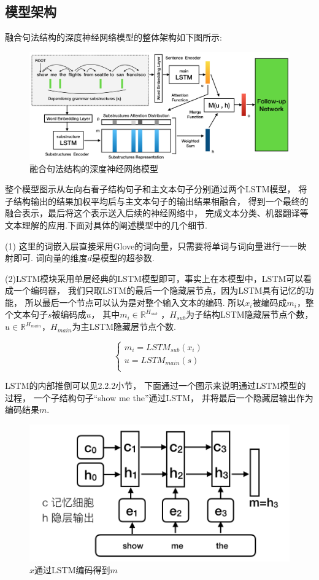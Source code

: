 \documentclass[bachelor,adobefonts]{jnuthesis}
\begin{document}
\subsection{模型架构}
融合句法结构的深度神经网络模型的整体架构如下图所示:
\begin{figure}[h!]
  \centering
  \includegraphics[width=0.95\linewidth]{model.png}
  \caption{融合句法结构的深度神经网络模型}
\end{figure}

整个模型图示从左向右看子结构句子和主文本句子分别通过两个LSTM模型，
将子结构输出的结果加权平均后与主文本句子的输出结果相融合，
得到一个最终的融合表示，最后将这个表示送入后续的神经网络中，
完成文本分类、机器翻译等文本理解的应用.下面对具体的阐述模型中的几个细节.

(1) 这里的词嵌入层直接采用Glove的词向量，只需要将单词与词向量进行一一映射即可.
词向量的维度$d$是模型的超参数.

(2)LSTM模块采用单层经典的LSTM模型即可，事实上在本模型中，LSTM可以看成一个编码器，
我们只取LSTM的最后一个隐藏层节点，因为LSTM具有记忆的功能，
所以最后一个节点可以认为是对整个输入文本的编码.
所以$x_{i}$被编码成$m_{i}$，整个文本句子$s$被编码成$u$，
其中$m_{i} \in \mathbb{R}^{H_{sub}}$ ，$H_{sub}$为子结构LSTM隐藏层节点个数，
$u \in \mathbb{R}^{H_{main}}$，$H_{main}$为主LSTM隐藏层节点个数.

\begin{equation}
\left\{
  \begin{array}{l}
   m_{i} = LSTM_{sub}(x_{i}) \\ 
   u = LSTM_{main}(s) \\ 
  \end{array}
  \right.
\end{equation}

LSTM的内部推倒可以见2.2.2小节，
下面通过一个图示来说明通过LSTM模型的过程，
一个子结构句子“show me the”通过LSTM，
并将最后一个隐藏层输出作为编码结果$m$.

\begin{figure}[h!]
  \centering
  \includegraphics[width=0.5\linewidth]{LSTM具体.png}
  \caption{$x$通过LSTM编码得到$m$}
\end{figure}
\end{document}
